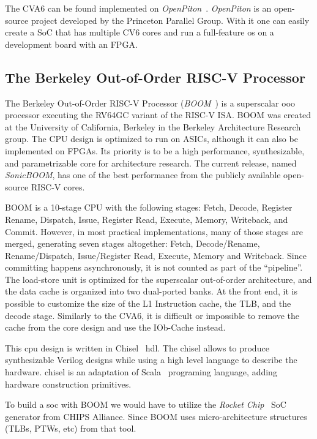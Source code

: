 The CVA6 can be found implemented on \textit{OpenPiton}~\cite{Balkind:2016:OOS:2872362.2872414}. \textit{OpenPiton} is an open-source project developed by the Princeton Parallel Group. With it one can easily create a SoC that has multiple CV6 cores and run a full-feature \acrfull{os} on a development board with an FPGA.

\subsection{The Berkeley Out-of-Order RISC-V Processor}
The Berkeley Out-of-Order RISC-V Processor (\textit{BOOM}~\cite{zhaosonicboom}) is a superscalar \acrfull{ooo} processor executing the RV64GC variant of the RISC-V ISA. BOOM was created at the University of California, Berkeley in the Berkeley Architecture Research group. The CPU design is optimized to run on ASICs, although it can also be implemented on FPGAs. Its priority is to be a high performance, synthesizable, and parametrizable core for architecture research. The current release, named \textit{SonicBOOM}, has one of the best performance from the publicly available open-source RISC-V cores.

BOOM is a 10-stage CPU with the following stages: Fetch, Decode, Register Rename, Dispatch, Issue, Register Read, Execute, Memory, Writeback, and Commit. However, in most practical implementations, many of those stages are merged, generating seven stages altogether: Fetch, Decode/Rename, Rename/Dispatch, Issue/Register Read, Execute, Memory and Writeback. Since committing happens asynchronously, it is not counted as part of the \enquote{pipeline}. The load-store unit is optimized for the superscalar out-of-order architecture, and the data cache is organized into two dual-ported banks. At the front end, it is possible to customize the size of the L1 Instruction cache, the TLB, and the decode stage. Similarly to the CVA6, it is difficult or impossible to remove the cache from the core design and use the IOb-Cache instead. 

This \acrshort{cpu} design is written in Chisel~\cite{bachrach2012chisel} \acrfull{hdl}. The \acrfull{chisel} allows to produce synthesizable Verilog designs while using a high level language to describe the hardware. \acrshort{chisel} is an adaptation of Scala~\cite{odersky2004scala} programing language, adding hardware construction primitives. 

To build a \acrfull{soc} with BOOM we would have to utilize the \textit{Rocket Chip}~\cite{asanovic2016rocket} SoC generator from CHIPS Alliance. Since BOOM uses micro-architecture structures (TLBs, PTWs, etc) from that tool.

